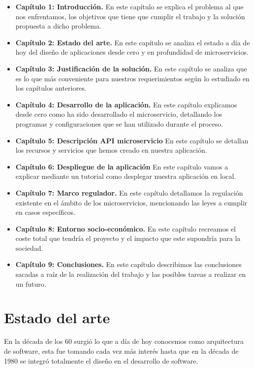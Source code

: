 \documentclass[12pt]{report} %
\begin{document}
	\begin{itemize}
		\item \textbf{Capítulo 1: Introducción.} En este capítulo se explica el problema al que nos enfrentamos, los objetivos que tiene que cumplir el trabajo y la solución propuesta a dicho problema.
		\item  \textbf{Capítulo 2: Estado del arte.}  En este capítulo se analiza el estado a día de hoy del diseño de aplicaciones desde cero y en profundidad de microservicios.
		\item  \textbf{Capítulo 3: Justificación de la solución.} En este capítulo se analiza que es lo que más conveniente para nuestros requerimientos según lo estudiado en los capítulos anteriores.
		\item  \textbf{Capítulo 4: Desarrollo de la aplicación.} En este capítulo explicamos desde cero como ha sido desarrollado el microservicio, detallando los programas y configuraciones que se han utilizado durante el proceso. 
		\item  \textbf{Capítulo 5: Descripción API microservicio} En este capítulo se detallan los recursos y servicios que hemos creado en nuestra aplicación.
		\item  \textbf{Capítulo 6: Despliegue de la aplicación} En este capítulo vamos a explicar mediante un tutorial como desplegar nuestra aplicación en local.
		\item  \textbf{Capítulo 7: Marco regulador.} En este capítulo detallamos la regulación existente en el ámbito de los microservicios, mencionando las leyes a cumplir en casos específicos.
		\item  \textbf{Capítulo 8: Entorno socio-económico.} En este capítulo recreamos el coste total que tendría el proyecto y el impacto que este supondría para la sociedad.
		\item  \textbf{Capítulo 9: Conclusiones.} En este capítulo describimos las conclusiones sacadas a raíz de la realización del trabajo y las posibles tareas a realizar en un futuro.

	\end{itemize}

	\chapter{Estado del arte}

	En la década de los 60 surgió lo que a día de hoy conocemos como arquitectura de software, esta fue tomando cada vez más interés hasta que en la década de 1980 se integró totalmente el diseño en el desarrollo de software. 
	
\end{document}

